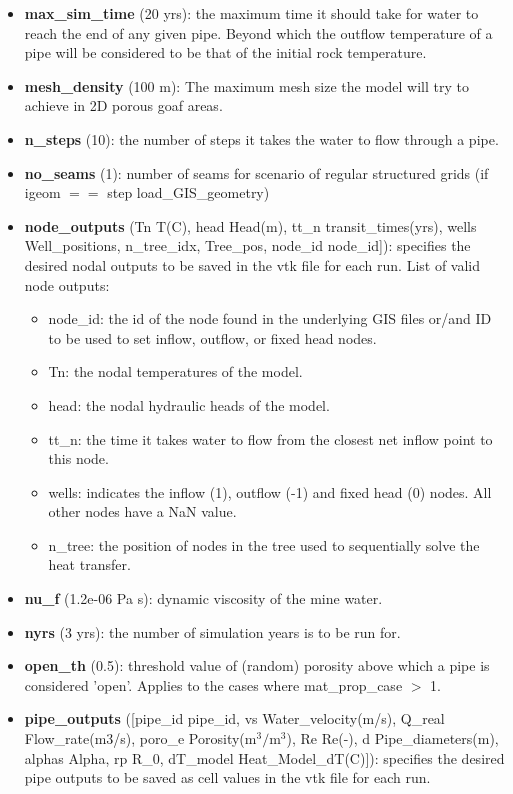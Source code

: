 \begin{itemize}
\item {\bf max\_sim\_time} (20 yrs): the maximum time it should take for water to reach the end of any given pipe. Beyond which the outflow temperature of a pipe will be considered to be that of the initial rock temperature.  
\item {\bf mesh\_density} (100 m): The maximum mesh size the model will try to achieve in 2D porous goaf areas. 
\item {\bf n\_steps} (10): the number of steps it takes the water to flow through a pipe.
\item {\bf no\_seams} (1): number of seams for scenario of regular structured grids (if igeom $==$ step load\_GIS\_geometry)
\item {\bf node\_outputs} (Tn T(C), head Head(m), tt\_n transit\_times(yrs), wells Well\_positions,
    n\_tree\_idx, Tree\_pos, node\_id node\_id]): specifies the desired nodal outputs to be saved in the vtk file for each run.  
        List of valid node outputs:
        \begin{itemize}  
            \item node\_id: the id of the node found in the underlying GIS files or/and ID to be used to set inflow, outflow, or fixed head nodes.
            \item Tn: the nodal temperatures of the model. 
            \item head: the nodal hydraulic heads of the model.
            \item tt\_n: the time it takes water to flow from the closest net inflow point to this node.
            \item wells: indicates the inflow (1), outflow (-1) and fixed head (0) nodes. All other nodes have a NaN value.
            \item n\_tree: the position of nodes in the tree used to sequentially solve the heat transfer.
        \end{itemize}
\item {\bf nu\_f} (1.2e-06 Pa s): dynamic viscosity of the mine water.
\item {\bf nyrs} (3 yrs): the number of simulation years is to be run for. 
\item {\bf open\_th} (0.5): threshold value of (random) porosity above which a pipe is considered 'open'. Applies to the cases where mat\_prop\_case $>$ 1.
\item {\bf pipe\_outputs} ([pipe\_id pipe\_id, vs Water\_velocity(m/s), Q\_real Flow\_rate(m3/s), poro\_e Porosity($\mathrm{m^3/m^3}$), Re Re(-), d Pipe\_diameters(m), alphas Alpha, rp R\_0, dT\_model Heat\_Model\_dT(C)]): specifies the desired pipe outputs to be saved as cell values in the vtk file for each run.

\end{itemize}
